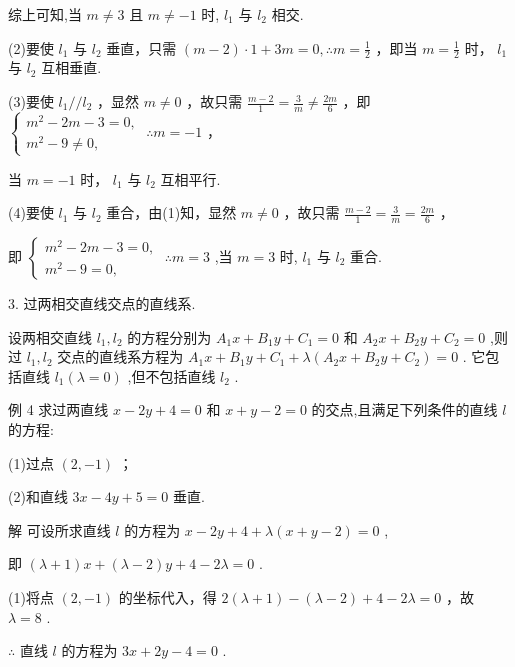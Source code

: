 \documentclass[10pt]{article}
\begin{document}
综上可知,当 \(m \neq  3\) 且 \(m \neq   - 1\) 时, \({l}_{1}\) 与 \({l}_{2}\) 相交.

(2)要使 \({l}_{1}\) 与 \({l}_{2}\) 垂直，只需 \(\left( {m - 2}\right)  \cdot  1 + {3m} = 0,\therefore m = \frac{1}{2}\) ，即当 \(m = \frac{1}{2}\) 时， \({l}_{1}\) 与 \({l}_{2}\) 互相垂直.

(3)要使 \({l}_{1}//{l}_{2}\) ，显然 \(m \neq  0\) ，故只需 \(\frac{m - 2}{1} = \frac{3}{m} \neq  \frac{2m}{6}\) ，即 \(\left\{  {\begin{array}{l} {m}^{2} - {2m} - 3 = 0, \\  {m}^{2} - 9 \neq  0, \end{array}\;\therefore m =  - 1}\right.\) ，

当 \(m =  - 1\) 时， \({l}_{1}\) 与 \({l}_{2}\) 互相平行.

(4)要使 \({l}_{1}\) 与 \({l}_{2}\) 重合，由(1)知，显然 \(m \neq  0\) ，故只需 \(\frac{m - 2}{1} = \frac{3}{m} = \frac{2m}{6}\) ，

即 \(\left\{  {\begin{array}{l} {m}^{2} - {2m} - 3 = 0, \\  {m}^{2} - 9 = 0, \end{array}\;\therefore m = 3}\right.\) ,当 \(m = 3\) 时, \({l}_{1}\) 与 \({l}_{2}\) 重合.

3. 过两相交直线交点的直线系.

设两相交直线 \({l}_{1},{l}_{2}\) 的方程分别为 \({A}_{1}x + {B}_{1}y + {C}_{1} = 0\) 和 \({A}_{2}x + {B}_{2}y + {C}_{2} = 0\) ,则过 \({l}_{1},{l}_{2}\) 交点的直线系方程为 \({A}_{1}x + {B}_{1}y + {C}_{1} + \lambda \left( {{A}_{2}x + {B}_{2}y + {C}_{2}}\right)  = 0\) . 它包括直线 \({l}_{1}\left( {\lambda  = 0}\right)\) ,但不包括直线 \({l}_{2}\) .

例 4 求过两直线 \(x - {2y} + 4 = 0\) 和 \(x + y - 2 = 0\) 的交点,且满足下列条件的直线 \(l\) 的方程:

(1)过点 \(\left( {2, - 1}\right)\) ；

(2)和直线 \({3x} - {4y} + 5 = 0\) 垂直.

解 可设所求直线 \(l\) 的方程为 \(x - {2y} + 4 + \lambda \left( {x + y - 2}\right)  = 0\) ,

即 \(\left( {\lambda  + 1}\right) x + \left( {\lambda  - 2}\right) y + 4 - {2\lambda } = 0\) .

(1)将点 \(\left( {2, - 1}\right)\) 的坐标代入，得 \(2\left( {\lambda  + 1}\right)  - \left( {\lambda  - 2}\right)  + 4 - {2\lambda } = 0\) ，故 \(\lambda  = 8\) .

\(\therefore\) 直线 \(l\) 的方程为 \({3x} + {2y} - 4 = 0\) .
\end{document}
